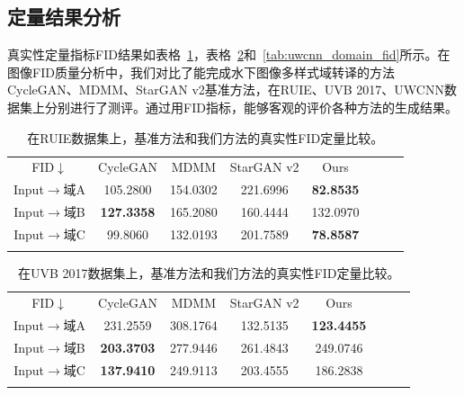 \subsection{定量结果分析}
真实性定量指标FID结果如表格~\ref{tab:ruie_domain_fid}，表格~\ref{tab:uvb_domain_fid}和~\ref{tab:uwcnn_domain_fid}所示。在图像FID质量分析中，我们对比了能完成水下图像多样式域转译的方法CycleGAN、MDMM、StarGAN v2基准方法，在RUIE、UVB 2017、UWCNN数据集上分别进行了测评。通过用FID指标，能够客观的评价各种方法的生成结果。

\begin{table}[ht]
\centering
\caption{在RUIE数据集上，基准方法和我们方法的真实性FID定量比较。}
  \begin{tabular}{c|ccccccc}
    \hline\noalign{\smallskip}
    FID$\downarrow$ & CycleGAN & MDMM & StarGAN v2 & Ours \\
    \noalign{\smallskip}\hline\noalign{\smallskip}
    Input$\rightarrow$域A & 105.2800 & 154.0302 & 221.6996 & \textbf{82.8535}  \\
    Input$\rightarrow$域B & \textbf{127.3358} & 165.2080 & 160.4444 & 132.0970  \\
    Input$\rightarrow$域C & 99.8060 & 132.0193 & 201.7589 & \textbf{78.8587}  \\
    \noalign{\smallskip}\hline
  \end{tabular}
  \label{tab:ruie_domain_fid}
\end{table}

\begin{table}[ht]
\centering
\caption{在UVB 2017数据集上，基准方法和我们方法的真实性FID定量比较。}
  \begin{tabular}{c|ccccccc}
    \hline\noalign{\smallskip}
    FID$\downarrow$ & CycleGAN & MDMM & StarGAN v2 & Ours \\
    \noalign{\smallskip}\hline\noalign{\smallskip}
    Input$\rightarrow$域A & 231.2559 & 308.1764 & 132.5135 & \textbf{123.4455}  \\
    Input$\rightarrow$域B & \textbf{203.3703} & 277.9446 & 261.4843 & 249.0746  \\
    Input$\rightarrow$域C & \textbf{137.9410} & 249.9113 & 203.4555 & 186.2838  \\
    \noalign{\smallskip}\hline
  \end{tabular}
  \label{tab:uvb_domain_fid}
\end{table}


